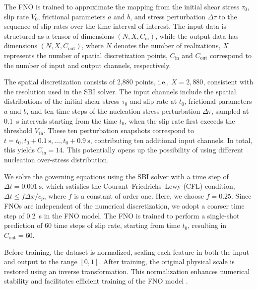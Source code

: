 \documentclass[draft]{agujournal2019}
\begin{document}
The FNO is trained to approximate the mapping from the initial shear stress \(\tau_0\), slip rate \(V_0\), frictional parameters \( a \) and \( b \), and stress perturbation \(\Delta\tau\) to the sequence of slip rates over the time interval of interest. The input data is structured as a tensor of dimensions \( (N, X, C_{\text{in}}) \), while the output data has dimensions \( (N, X, C_{\text{out}}) \), where \( N \) denotes the number of realizations, \( X \) represents the number of spatial discretization points, \( C_{\text{in}} \) and \( C_{\text{out}} \) correspond to the number of input and output channels, respectively.

The spatial discretization consists of 2,880 points, i.e., \( X = 2{,}880 \), consistent with the resolution used in the SBI solver. The input channels include the spatial distributions of the initial shear stress \(\tau_0\) and slip rate at \(t_0\), frictional parameters \(a\) and \(b\), and ten time steps of the nucleation stress perturbation \(\Delta \tau\), sampled at 0.1~s intervals starting from the time \(t_0\), when the slip rate first exceeds the threshold \(V_\text{th}\). These ten perturbation snapshots correspond to \(t = t_0, t_0 + 0.1~\text{s}, \ldots, t_0 + 0.9~\text{s}\), contributing ten additional input channels. In total, this yields \(C_{\text{in}} = 14\). This potentially opens up the possibility of using different nucleation over-stress distribution.

We solve the governing equations using the SBI solver with a time step of \(\Delta t = 0.001~\text{s}\), which satisfies the Courant–Friedrichs–Lewy (CFL) condition, \(\Delta t \leq f \Delta x / c_p\), where \(f\) is a constant of order one. Here, we choose \(f = 0.25\). Since FNOs are independent of the numerical discretization, we adopt a coarser time step of 0.2~s in the FNO model. The FNO is trained to perform a single-shot prediction of 60 time steps of slip rate, starting from time \(t_0\), resulting in \(C_{\text{out}} = 60\).


Before training, the dataset is normalized, scaling each feature in both the input and output to the range \([0,1]\). After training, the original physical scale is restored using an inverse transformation. This normalization enhances numerical stability and facilitates efficient training of the FNO model \cite{cuomo2022scientific}.
\end{document}
